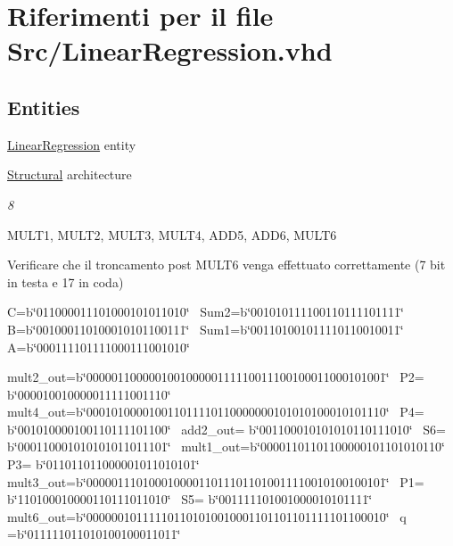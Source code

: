 \hypertarget{_linear_regression_8vhd}{}\section{Riferimenti per il file Src/\+Linear\+Regression.vhd}
\label{_linear_regression_8vhd}
\subsection*{Entities}
\begin{DoxyCompactItemize}
\item 
\hyperlink{class_linear_regression}{Linear\+Regression} entity
\item 
\hyperlink{class_linear_regression_1_1_structural}{Structural} architecture
\begin{DoxyCompactList}\small\item\em 8 

M\+U\+L\+T1, M\+U\+L\+T2, M\+U\+L\+T3, M\+U\+L\+T4, A\+D\+D5, A\+D\+D6, M\+U\+L\+T6 

Verificare che il troncamento post M\+U\+L\+T6 venga effettuato correttamente (7 bit in testa e 17 in coda) 

C=b\char`\"{}011000011101000101011010\char`\"{}~\newline
 Sum2=b\char`\"{}001010111100110111101111\char`\"{}~\newline
 B=b\char`\"{}001000110100010101100111\char`\"{}~\newline
 Sum1=b\char`\"{}001101001011110110010011\char`\"{}~\newline
 A=b\char`\"{}000111101111000111001010\char`\"{}  

mult2\+\_\+out=b\char`\"{}000001100000100100000111110011100100011000101001\char`\"{}~\newline
 P2= b\char`\"{}000010010000011111001110\char`\"{}~\newline
 mult4\+\_\+out=b\char`\"{}000101000010011011110110000000101010100010101110\char`\"{}~\newline
 P4= b\char`\"{}001010000100110111101100\char`\"{}~\newline
 add2\+\_\+out= b\char`\"{}001100010101010110111010\char`\"{}~\newline
 S6= b\char`\"{}000110001010101011011101\char`\"{}~\newline
 mult1\+\_\+out=b\char`\"{}00001101101100000101101010110\char`\"{}~\newline
 P3= b\char`\"{}011011011000001011010101\char`\"{}~\newline
 mult3\+\_\+out=b\char`\"{}000001110100010000110111011010011110010100100101\char`\"{}~\newline
 P1= b\char`\"{}110100010000110111011010\char`\"{}~\newline
 S5= b\char`\"{}001111101001000010101111\char`\"{}~\newline
 mult6\+\_\+out=b\char`\"{}000000101111101101010010001101101101111101100010\char`\"{}~\newline
 q =b\char`\"{}011111011010100100011011\char`\"{}  


\end{DoxyCompactList}
\end{DoxyCompactItemize}
